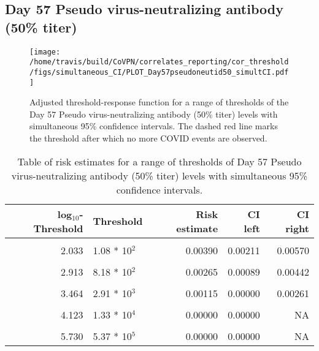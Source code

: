 \documentclass[]{book}
\theoremstyle{definition}
\theoremstyle{definition}
\theoremstyle{definition}
\newcommand{\1}{\mathbbm{1}}
\begin{document}
\clearpage

\clearpage

\clearpage

\hypertarget{day-57-pseudo-virus-neutralizing-antibody-50-titer-2}{%
\subsection{Day 57 Pseudo virus-neutralizing antibody (50\% titer)}\label{day-57-pseudo-virus-neutralizing-antibody-50-titer-2}}

\begin{figure}[H]
\centering
\texttt{[image: /home/travis/build/CoVPN/correlates\_reporting/cor\_threshold/figs/simultaneous\_CI/PLOT\_Day57pseudoneutid50\_simultCI.pdf]}
\caption{Adjusted threshold-response function for a range of thresholds of the
  Day 57 Pseudo virus-neutralizing antibody (50\% titer) levels with simultaneous 95\% confidence intervals. The dashed red line marks the threshold after which no more COVID events are observed. }
\end{figure}
\begin{table}[!h]

\caption{\label{tab:unnamed-chunk-383}Table of risk estimates for a range of thresholds of Day 57 Pseudo virus-neutralizing antibody (50\% titer) levels with simultaneous 95\% confidence intervals.}
\centering
\begin{tabular}[t]{rlrrr}
\toprule
log$_{10}$-Threshold & Threshold & Risk estimate & CI left & CI right\\
\midrule
\cellcolor{gray!6}{0.699} & \cellcolor{gray!6}{5.00 * 10$^0$} & \cellcolor{gray!6}{0.00508} & \cellcolor{gray!6}{0.00314} & \cellcolor{gray!6}{0.00701}\\
2.033 & 1.08 * 10$^2$ & 0.00390 & 0.00211 & 0.00570\\
\cellcolor{gray!6}{2.447} & \cellcolor{gray!6}{2.80 * 10$^2$} & \cellcolor{gray!6}{0.00347} & \cellcolor{gray!6}{0.00165} & \cellcolor{gray!6}{0.00529}\\
2.913 & 8.18 * 10$^2$ & 0.00265 & 0.00089 & 0.00442\\
\cellcolor{gray!6}{3.196} & \cellcolor{gray!6}{1.57 * 10$^3$} & \cellcolor{gray!6}{0.00235} & \cellcolor{gray!6}{0.00055} & \cellcolor{gray!6}{0.00416}\\
3.464 & 2.91 * 10$^3$ & 0.00115 & 0.00000 & 0.00261\\
\cellcolor{gray!6}{3.736} & \cellcolor{gray!6}{5.45 * 10$^3$} & \cellcolor{gray!6}{0.00134} & \cellcolor{gray!6}{0.00000} & \cellcolor{gray!6}{0.00312}\\
4.123 & 1.33 * 10$^4$ & 0.00000 & 0.00000 & NA\\
\cellcolor{gray!6}{4.629} & \cellcolor{gray!6}{4.26 * 10$^4$} & \cellcolor{gray!6}{0.00000} & \cellcolor{gray!6}{0.00000} & \cellcolor{gray!6}{NA}\\
5.730 & 5.37 * 10$^5$ & 0.00000 & 0.00000 & NA\\
\bottomrule
\end{tabular}
\end{table}
\end{document}

